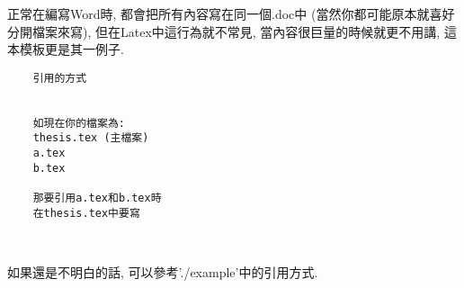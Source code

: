 
正常在編寫Word時, 都會把所有內容寫在同一個.doc中 (當然你都可能原本就喜好分開檔案來寫), 但在Latex中這行為就不常見, 當內容很巨量的時候就更不用講, 這本模板更是其一例子.

\begin{framed}
  \begin{verbatim}
    引用的方式
    

    如現在你的檔案為:
    thesis.tex (主檔案)
    a.tex
    b.tex

    那要引用a.tex和b.tex時
    在thesis.tex中要寫
    
    
  \end{verbatim}
\end{framed}

如果還是不明白的話, 可以參考'./example'中的引用方式.

